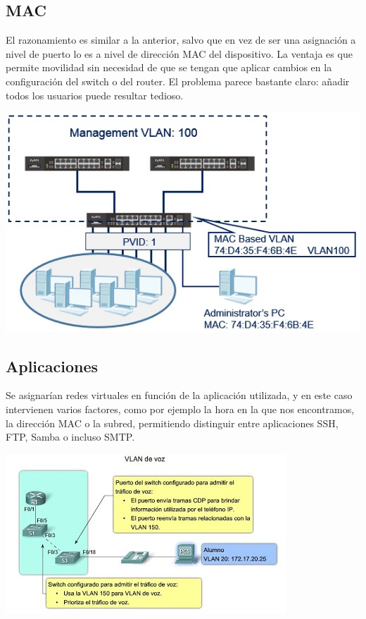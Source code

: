  \subsection{MAC}
 \begin{definicion}[]
{
 El razonamiento es similar a la anterior, salvo que en vez de ser una asignaci\'on a nivel de puerto lo es a nivel de direcci\'on MAC del dispositivo. La ventaja es que permite movilidad sin necesidad de que se tengan que aplicar cambios en la configuraci\'on del switch o del router. El problema parece bastante claro: a\~nadir todos los usuarios puede resultar tedioso.
}
\end{definicion}

\begin{caja}[]{
\includegraphics[scale=1]{img/mac.jpg} 
 }\end{caja}

 \subsection{Aplicaciones}
 \begin{definicion}[]
{
Se asignar\'ian redes virtuales en funci\'on de la aplicaci\'on utilizada, y en este caso intervienen varios factores, como por ejemplo la hora en la que nos encontramos, la direcci\'on MAC o la subred, permitiendo distinguir entre aplicaciones SSH, FTP, Samba o incluso SMTP.
}
\end{definicion}

\begin{caja}[]{
\includegraphics[scale=1]{img/aplicaciones.jpg} 
 }\end{caja}

